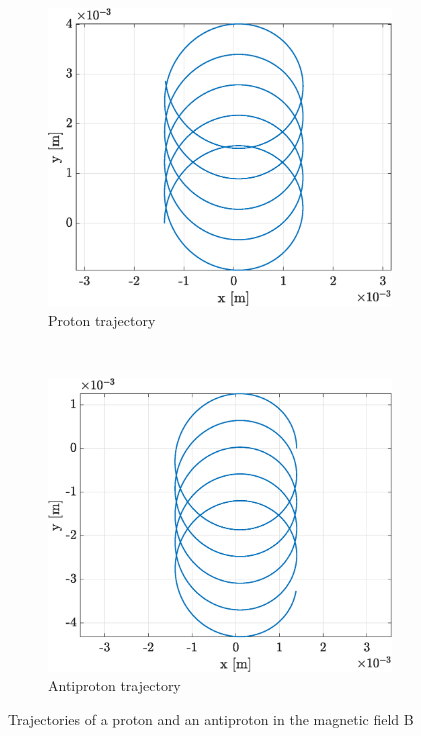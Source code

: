 \documentclass[a4paper,12pt,twoside]{article}
\begin{document}
\begin{figure}[h]
\centering
\begin{subfigure}[t]{0.45\textwidth}
	\includegraphics[width=\textwidth]{graphs/app2_ipos_traj.eps}
	\caption{Proton trajectory}
	\label{fig:app2-ipos-traj}
\end{subfigure}
~
\begin{subfigure}[t]{0.45\textwidth}
	\includegraphics[width=\textwidth]{graphs/app2_ineg_traj.eps}
	\caption{Antiproton trajectory}
	\label{fig:app2-ineg-traj}
\end{subfigure}
\caption{Trajectories of a proton and an antiproton in the magnetic field B}
\end{figure}
\end{document}
